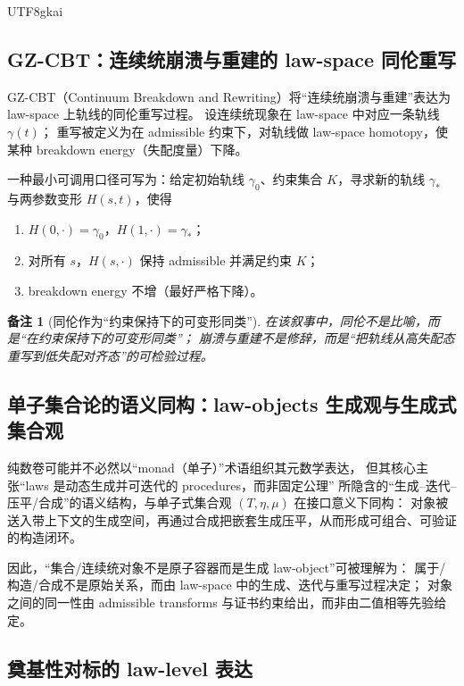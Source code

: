\documentclass[12pt]{article}
\newtheorem{remark}{备注}[section]
\begin{document}
\begin{CJK*}{UTF8}{gkai}
\subsection{GZ-CBT：连续统崩溃与重建的 law-space 同伦重写}
\label{subsec:tex19-ch2-gz-cbt}

GZ-CBT（Continuum Breakdown and Rewriting）将“连续统崩溃与重建”表达为 law-space 上轨线的同伦重写过程。
设连续统现象在 law-space 中对应一条轨线 $\gamma(t)$；
重写被定义为在 admissible 约束下，对轨线做 law-space homotopy，使某种 breakdown energy（失配度量）下降。

一种最小可调用口径可写为：给定初始轨线 $\gamma_0$、约束集合 $K$，寻求新的轨线 $\gamma_\ast$ 与两参数变形 $H(s,t)$，使得
\begin{enumerate}
  \item $H(0,\cdot)=\gamma_0$，$H(1,\cdot)=\gamma_\ast$；
  \item 对所有 $s$，$H(s,\cdot)$ 保持 admissible 并满足约束 $K$；
  \item breakdown energy 不增（最好严格下降）。
\end{enumerate}

\begin{remark}[同伦作为“约束保持下的可变形同类”]
在该叙事中，同伦不是比喻，而是“在约束保持下的可变形同类”；
崩溃与重建不是修辞，而是“把轨线从高失配态重写到低失配对齐态”的可检验过程。
\end{remark}

\subsection{单子集合论的语义同构：law-objects 生成观与生成式集合观}
\label{subsec:tex19-ch2-monad-vs-law-objects}

纯数卷可能并不必然以“monad（单子）”术语组织其元数学表达，
但其核心主张“laws 是动态生成并可迭代的 procedures，而非固定公理”
所隐含的“生成--迭代--压平/合成”的语义结构，与单子式集合观 $(T,\eta,\mu)$ 在接口意义下同构：
对象被送入带上下文的生成空间，再通过合成把嵌套生成压平，从而形成可组合、可验证的构造闭环。

因此，“集合/连续统对象不是原子容器而是生成 law-object”可被理解为：
属于/构造/合成不是原始关系，而由 law-space 中的生成、迭代与重写过程决定；
对象之间的同一性由 admissible transforms 与证书约束给出，而非由二值相等先验给定。

\subsection{奠基性对标的 law-level 表达}
\label{subsec:tex19-ch2-foundational-comparison}


\end{CJK*}
\end{document}
